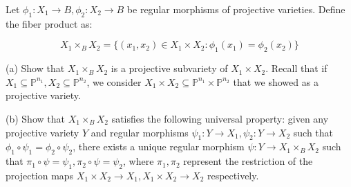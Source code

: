 \documentclass[10pt]{article}
\newenvironment{problem}[2][Problem]{\begin{trivlist}
\item[\hskip \labelsep {\bfseries #1}\hskip \labelsep {\bfseries #2.}]}{\end{trivlist}}
\begin{document}
\begin{problem}{5.2}

Let $\phi_1: X_1 \to B, \phi_2: X_2 \to B$ be regular morphisms of projective varieties. Define the fiber product as:

$$ X_1 \times_B X_2 = \{ (x_1,x_2) \in X_1 \times X_2 : \phi_1(x_1) = \phi_2(x_2) \} $$

(a) Show that $ X_1 \times_B X_2$ is a projective subvariety of $X_1 \times X_2$. Recall that if $X_1 \subseteq \mathbb{P}^{n_1}, X_2 \subseteq \mathbb{P}^{n_2}$, we consider $X_1 \times X_2 \subseteq \mathbb{P}^{n_1} \times \mathbb{P}^{n_2}$ that we showed as a projective variety.

(b)  Show that $ X_1 \times_B X_2$ satisfies the following universal property: given any projective variety $Y$ and regular morphisms $\psi_1: Y \to X_1, \psi_2: Y \to X_2$ such that $\phi_1 \circ \psi_1 = \phi_2 \circ \psi_2$, there exists a unique regular morphism $\psi: Y \to X_1 \times_B X_2$ such that $\pi_1 \circ \psi = \psi_1, \pi_2 \circ \psi = \psi_2$, where $\pi_1,\pi_2$ represent the restriction of the projection maps $X_1 \times X_2 \to X_1, X_1 \times X_2 \to X_2$ respectively.

\end{problem}
\end{document}
